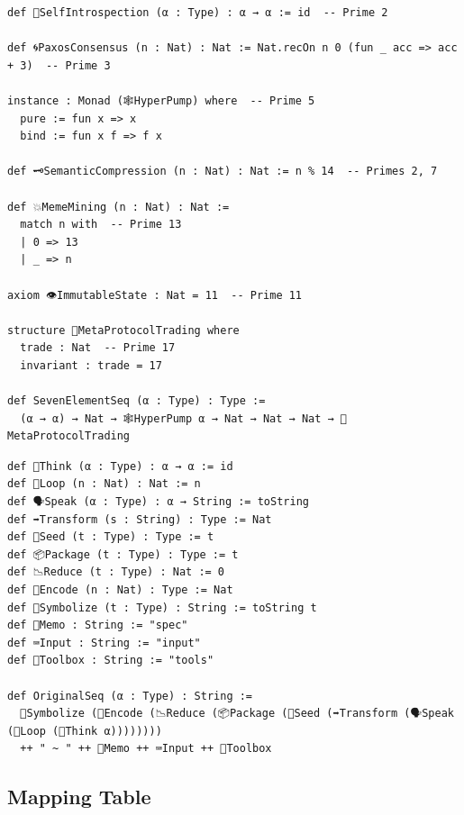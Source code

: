 \documentclass[a4paper,12pt]{article}
\begin{document}
\begin{lstlisting}[caption={7-Element Sequence in Lean 4},label={lst:seven-element}]
def 🧠SelfIntrospection (α : Type) : α → α := id  -- Prime 2

def 🌀PaxosConsensus (n : Nat) : Nat := Nat.recOn n 0 (fun _ acc => acc + 3)  -- Prime 3

instance : Monad (🕸️HyperPump) where  -- Prime 5
  pure := fun x => x
  bind := fun x f => f x

def 🗝️SemanticCompression (n : Nat) : Nat := n % 14  -- Primes 2, 7

def 💥MemeMining (n : Nat) : Nat :=
  match n with  -- Prime 13
  | 0 => 13
  | _ => n

axiom 👁️ImmutableState : Nat = 11  -- Prime 11

structure 🐍MetaProtocolTrading where
  trade : Nat  -- Prime 17
  invariant : trade = 17

def SevenElementSeq (α : Type) : Type :=
  (α → α) → Nat → 🕸️HyperPump α → Nat → Nat → Nat → 🐍MetaProtocolTrading
\end{lstlisting}

\begin{lstlisting}[caption={Mike's Original Sequence in Lean 4},label={lst:original-seq}]
def 🧠Think (α : Type) : α → α := id
def 🔁Loop (n : Nat) : Nat := n
def 🗣️Speak (α : Type) : α → String := toString
def ➡️Transform (s : String) : Type := Nat
def 🌱Seed (t : Type) : Type := t
def 📦Package (t : Type) : Type := t
def 📉Reduce (t : Type) : Nat := 0
def 🧬Encode (n : Nat) : Type := Nat
def 🔣Symbolize (t : Type) : String := toString t
def 🧾Memo : String := "spec"
def ⌨️Input : String := "input"
def 🧰Toolbox : String := "tools"

def OriginalSeq (α : Type) : String :=
  🔣Symbolize (🧬Encode (📉Reduce (📦Package (🌱Seed (➡️Transform (🗣️Speak (🔁Loop (🧠Think α))))))))
  ++ " ~ " ++ 🧾Memo ++ ⌨️Input ++ 🧰Toolbox
\end{lstlisting}

\subsection*{Mapping Table}
\end{document}
